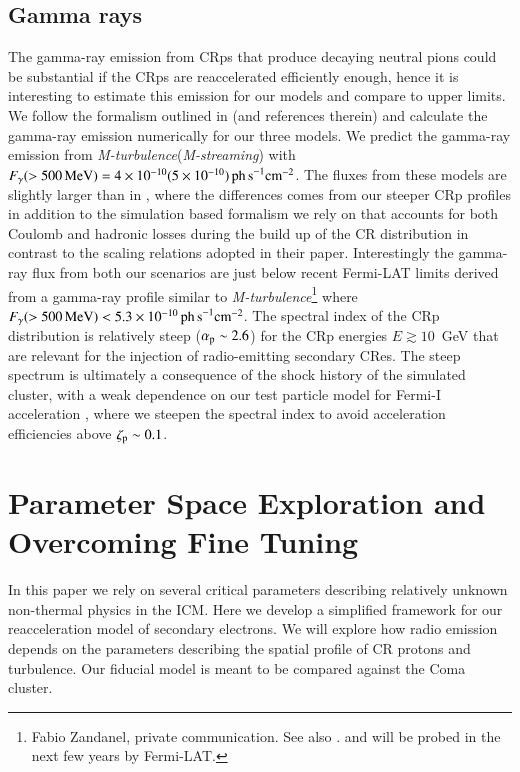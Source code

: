 \documentclass[fleqn,usenatbib,useAMS]{mnras}
\newcommand{\Mstream}{{\it M-streaming}\xspace}
\newcommand{\Mflatturb}{{\it M-turbulence}\xspace}
\begin{document}
\subsection{Gamma rays}
The gamma-ray emission from CRps that produce decaying neutral pions could be
substantial if the CRps are reaccelerated efficiently enough, hence it is
interesting to estimate this emission for our models and compare to upper
limits. We follow the formalism outlined in \cite{1999APh....12..169B} (and
references therein) and calculate the gamma-ray emission numerically for our
three models. We predict the gamma-ray emission from \Mflatturb (\Mstream) with
$F_\gamma(>500\,{\mathrm{MeV}})=4\times10^{-10} (5\times10^{-10}) \mathrm{ \,ph\,
  s}^{-1}\mathrm{cm}^{-2}$. The fluxes from these models are slightly larger
than in \cite{brunetti12}, where the differences comes from our steeper CRp
profiles in addition to the simulation based formalism we rely on that accounts
for both Coulomb and hadronic losses during the build up of the CR distribution
in contrast to the scaling relations adopted in their paper. Interestingly the
gamma-ray flux from both our scenarios are just below recent Fermi-LAT limits
derived from a gamma-ray profile similar to \Mflatturb\footnote{Fabio Zandanel,
  private communication. See also
  \citet{2014MNRAS.440..663Z,2014ApJ...787...18A}. and will be probed in the
  next few years by Fermi-LAT.} where
$F_\gamma(>500\,{\mathrm{MeV}})<5.3\times10^{-10} \mathrm{ \,ph\,
  s}^{-1}\mathrm{cm}^{-2}$.  The spectral index of the CRp distribution is
relatively steep ($\alpha_{{\mathrm{p}}}\sim2.6$) for the CRp energies $E \gtrsim
10$~GeV that are relevant for the injection of radio-emitting secondary
CRes. The steep spectrum is ultimately a consequence of the shock history of the
simulated cluster, with a weak dependence on our test particle model for Fermi-I
acceleration \citep{pinzke13}, where we steepen the spectral index to avoid
acceleration efficiencies above $\zeta_{{\mathrm{p}}} \sim 0.1$.


\section{Parameter Space Exploration and Overcoming Fine Tuning}
\label{sect:param_comp}
In this paper we rely on several critical parameters describing
relatively unknown non-thermal physics in the ICM. Here we develop a
simplified framework for our reacceleration model of secondary
electrons. We will explore how radio emission depends on the
parameters describing the spatial profile of CR protons and
turbulence. Our fiducial model is meant to be
compared against the Coma cluster.
\end{document}
